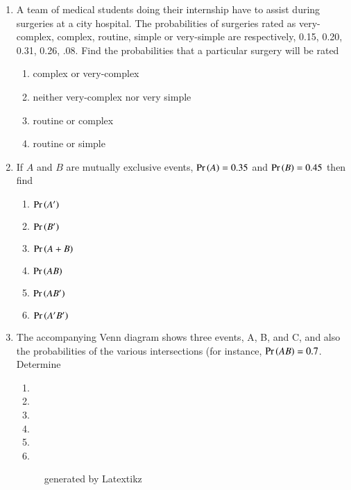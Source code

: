 \begin{enumerate}[label=\thesection.\arabic*,ref=\thesection.\theenumi]
	\item A team of medical students doing their internship have to assist during surgeries
at a city hospital. The probabilities of surgeries rated as very-complex, complex,
routine, simple or very-simple are respectively, 0.15, 0.20, 0.31, 0.26, .08. Find
the probabilities that a particular surgery will be rated
\begin{enumerate}
\item complex or very-complex
\item neither very-complex nor very simple
\item routine or complex
\item routine or simple
\end{enumerate}
		\solution
		
\item If $A$ and $B$ are mutually exclusive events, $\Pr\left(A\right)=0.35$ and $\Pr\left(B\right)=0.45$ then find
\begin{enumerate}
\item $\Pr\left(A'\right)$
\item $\Pr\left(B'\right)$
\item $\Pr\left(A+B\right)$
\item $\Pr\left(AB\right)$
\item $\Pr\left(AB'\right)$
\item $\Pr\left(A'B'\right)$
\end{enumerate}
%

%
\item The accompanying Venn diagram shows three events, A, B, and C, and also the probabilities of the various intersections (for instance, $\Pr\left(AB\right)=0.7$. Determine 
	\begin{enumerate}
		\item {}
		\item {}
		\item {}
		\item {}
		\item {}
		\item {}
	\end{enumerate}
	\begin{figure}[h!]
		\centering
		
		\caption {generated by Latextikz}
		\label{fig:exemplar/11/16/3/11}
	\end{figure}
		\solution
		
  

\end{enumerate}
